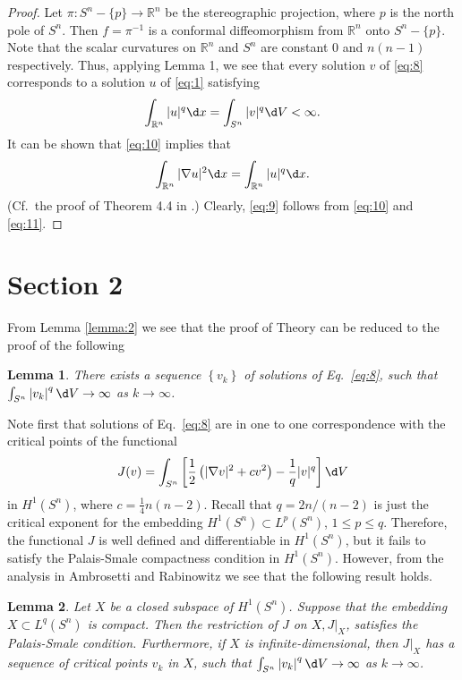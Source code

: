 \documentclass[11pt]{article}
\newtheorem{lemma}{Lemma}
\begin{document}
\begin{proof}
  Let $\pi: S^n-\{p\} \rightarrow \mathbb{R}^n$ be the stereographic projection,
  where $p$ is the north pole of $S^n$.
  Then $f=\pi^{-1}$ is a conformal diffeomorphism from $\mathbb{R}^n$ onto $S^n-\{p\}$.
  Note that the scalar curvatures on $\mathbb{R}^n$ and $S^n$ are constant 0 and $n(n-1)$ respectively. 
  Thus, applying Lemma 1, we see that every solution $v$ of \eqref{eq:8} corresponds to
  a solution $u$ of \eqref{eq:1} satisfying
  \begin{equation}\label{eq:10}
    \int_{\mathbb{R}^n}|u|^q \d x=\int_{S^n}|v|^q \d V<\infty .  
  \end{equation}
  It can be shown that \eqref{eq:10} implies that
  \begin{equation}\label{eq:11}
    \int_{\mathbb{R}^n}|\nabla u|^2 \d x=\int_{\mathbb{R}^n}|u|^q \d x .  
  \end{equation}
  (Cf.~the proof of Theorem 4.4 in \cite{wei1985elliptic}.) Clearly, \eqref{eq:9} follows from \eqref{eq:10} and \eqref{eq:11}.
\end{proof}


\section*{Section 2}

From Lemma \ref{lemma:2} we see that the proof of
Theory can be reduced to the proof of the following

\begin{lemma}\label{lemma:3}
  There exists a sequence $\left\{v_k\right\}$ of solutions of Eq.~\eqref{eq:8},
  such that $\int_{S^n}\left|v_k\right|^q \d V \rightarrow \infty$ as $k \rightarrow \infty$.
\end{lemma}

Note first that solutions of Eq.~\eqref{eq:8} are in one to one correspondence with the 
critical points of the functional
\[
J(v)=\int_{S^n}\left[\frac{1}{2}\left(|\nabla v|^2+c v^2\right)-\frac{1}{q}|v|^q\right] \d V
\]
in $H^1(S^n)$, where $c=\frac{1}{4} n(n-2)$.
Recall that $q=2 n /(n-2)$ is just the critical exponent for the embedding $H^1(S^n) \subset L^p\left(S^n\right)$, $1 \leq p \leq q$. 
Therefore, the functional $J$ is well defined and differentiable in $H^1(S^n)$,
but it fails to satisfy the Palais-Smale compactness condition in $H^1(S^n)$.
However, from the analysis in Ambrosetti and Rabinowitz \cite{ambrosetti1973dual} we see that the following
result holds.

\begin{lemma}\label{lemma:4}
  Let $X$ be a closed subspace of $H^1(S^n)$.
  Suppose that the embedding $X \subset L^q(S^n)$ is compact.
  Then the restriction of $J$ on $X, J|_X$, satisfies the Palais-Smale condition. 
  Furthermore, if $X$ is infinite-dimensional, then $J|_X$ has a sequence of critical 
  points $v_k$ in $X$, such that $\int_{S^n}\left|v_k\right|^q \d V \rightarrow \infty$
  as $k \rightarrow \infty$.
\end{lemma}
\end{document}
